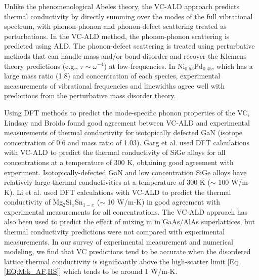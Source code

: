 \documentclass[aps,prb,onecolumn,preprint,footinbib,superscriptaddress,amsmath,amssymb,floatfix]{revtex4}
\begin{document}
Unlike the phenomenological 
Abeles theory, the VC-ALD approach predicts thermal conductivity 
by directly summing over the modes of the full vibrational spectrum, 
with phonon-phonon and phonon-defect scattering treated as 
perturbations.
\cite{garg_role_2011,tian_phonon_2012,lindsay_thermal_2012} 
In the VC-ALD method, the phonon-phonon scattering is  
predicted using ALD.\cite{turney_predicting_2009,
esfarjani_heat_2011} 
The phonon-defect scattering is treated 
using perturbative methods that can handle mass and/or bond disorder 
and recover the Klemens theory predictions 
(e.g., $\tau \sim \omega^{-4}$) at low-frequencies.
\cite{klemens_scattering_1955,klemens_thermal_1957,
mattis_phonon_1957,tamura_isotope_1983} 
In Ni$_{0.55}$Pd$_{0.45}$, 
which has a large mass ratio (1.8) and concentration of each species, 
experimental measurements of   
vibrational frequencies and linewidths agree well with 
predictions from the perturbative mass disorder theory.
\cite{mattis_phonon_1957,kamitakahara_vibrations_1974,
tamura_isotope_1983} 

Using DFT methods to predict 
the mode-specific phonon properties of the VC, Lindsay and Broido 
found good agreement between VC-ALD and experimental measurements of 
thermal conductivity for 
isotopically defected GaN (isotope concentration of 0.6 and 
mass ratio of 1.03).\cite{lindsay_thermal_2012} 
Garg et al. used DFT calculations with VC-ALD   
to predict the thermal conductivity of SiGe alloys 
for all concentrations at a temperature of 300 K, 
obtaining good agreement with experiment.\cite{garg_role_2011}  
Isotopically-defected GaN and low concentration SiGe alloys 
have relatively large 
thermal conductivities at a temperature of 300 K ($\sim$ 100 W/m-K). 
Li et al. used DFT calculations with VC-ALD to predict the thermal 
conductivity of Mg$_2$Si$_x$Sn$_{1-x}$ ($\sim$ 10 W/m-K) 
in good agreement with 
experimental measurements for all concentrations.\cite{li_thermal_2012}
The VC-ALD approach has also been used to predict the effect of mixing 
in in GaAs/AlAs superlattices, but thermal 
conductivity predictions were not compared with experimental 
measurements.\cite{luckyanova_coherent_2012}  
In our survey of experimental measurement and numerical modeling, 
we find that 
VC predictions tend to be accurate when the disordered lattice 
thermal conductivity 
is significantly above the high-scatter limit [Eq. \eqref{EQ:M:k_AF,HS}] 
which tends to be around 1 W/m-K.
\cite{abeles_lattice_1963,kamitakahara_vibrations_1974,
cahill_thermal_2004,cahill_thermal_2005,
cahill_lattice_1988,garg_role_2011,lindsay_thermal_2012} 
\end{document}
